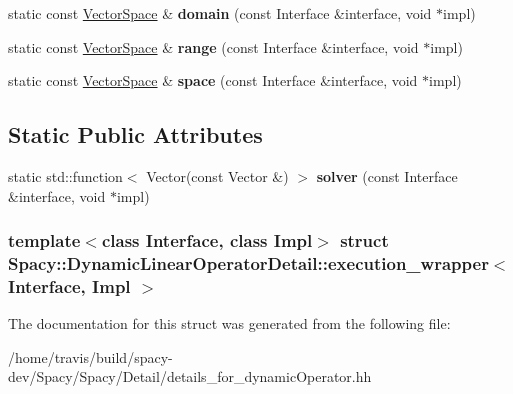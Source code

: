 \begin{DoxyCompactItemize}
\item 
\hypertarget{structSpacy_1_1DynamicLinearOperatorDetail_1_1execution__wrapper_aac8e02a25597693baa71a2d158260c66}{static const \hyperlink{classSpacy_1_1VectorSpace}{\-Vector\-Space} \& {\bfseries domain} (const \-Interface \&interface, void $\ast$impl)}\label{structSpacy_1_1DynamicLinearOperatorDetail_1_1execution__wrapper_aac8e02a25597693baa71a2d158260c66}

\item 
\hypertarget{structSpacy_1_1DynamicLinearOperatorDetail_1_1execution__wrapper_a3a16029a0a0f16cda94ecc3cb46cba58}{static const \hyperlink{classSpacy_1_1VectorSpace}{\-Vector\-Space} \& {\bfseries range} (const \-Interface \&interface, void $\ast$impl)}\label{structSpacy_1_1DynamicLinearOperatorDetail_1_1execution__wrapper_a3a16029a0a0f16cda94ecc3cb46cba58}

\item 
\hypertarget{structSpacy_1_1DynamicLinearOperatorDetail_1_1execution__wrapper_ad4647aace68182fa1c18c4d77c51c779}{static const \hyperlink{classSpacy_1_1VectorSpace}{\-Vector\-Space} \& {\bfseries space} (const \-Interface \&interface, void $\ast$impl)}\label{structSpacy_1_1DynamicLinearOperatorDetail_1_1execution__wrapper_ad4647aace68182fa1c18c4d77c51c779}

\end{DoxyCompactItemize}
\subsection*{\-Static \-Public \-Attributes}
\begin{DoxyCompactItemize}
\item 
\hypertarget{structSpacy_1_1DynamicLinearOperatorDetail_1_1execution__wrapper_a72dc13b21b7c0a221bf9eb64be66da91}{static std\-::function$<$ \-Vector(const \*
\-Vector \&) $>$ {\bfseries solver} (const \-Interface \&interface, void $\ast$impl)}\label{structSpacy_1_1DynamicLinearOperatorDetail_1_1execution__wrapper_a72dc13b21b7c0a221bf9eb64be66da91}

\end{DoxyCompactItemize}
\subsubsection*{template$<$class Interface, class Impl$>$ struct Spacy\-::\-Dynamic\-Linear\-Operator\-Detail\-::execution\-\_\-wrapper$<$ Interface, Impl $>$}



\-The documentation for this struct was generated from the following file\-:\begin{DoxyCompactItemize}
\item 
/home/travis/build/spacy-\/dev/\-Spacy/\-Spacy/\-Detail/details\-\_\-for\-\_\-dynamic\-Operator.\-hh\end{DoxyCompactItemize}
